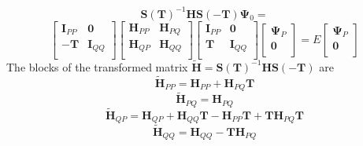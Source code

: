 \documentclass[12pt]{article}
\begin{document}
\begin{equation}
\mathbf{S}(\mathbf{T})^{-1} \mathbf{H} \mathbf{S}(-\mathbf{T})\boldsymbol{\Psi}_{0} = 
\end{equation}
\begin{equation}
\begin{bmatrix}
\mathbf{I}_{PP} & \mathbf{0} \\ 
-\mathbf{T} & \mathbf{I}_{QQ} \\ 
\end{bmatrix}
\begin{bmatrix}
 \mathbf{H}_{PP} & \mathbf{H}_{PQ} \\ 
 \mathbf{H}_{QP} & \mathbf{H}_{QQ} \\ 
\end{bmatrix} 
\begin{bmatrix}
\mathbf{I}_{PP} & \mathbf{0} \\ 
\mathbf{T} & \mathbf{I}_{QQ} \\ 
\end{bmatrix}
\begin{bmatrix}
 \boldsymbol{\Psi}_{P} \\ 
 \mathbf{0}\\ 
\end{bmatrix} 
= E 
\begin{bmatrix}
 \boldsymbol{\Psi}_{P} \\ 
 \mathbf{0}\\ 
\end{bmatrix} 
\label{eqn:TransEvalEqn}
\end{equation}
The blocks of the transformed matrix $\mathbf{\tilde{H}} = \mathbf{S}(\mathbf{T})^{-1} \mathbf{H} \mathbf{S}(-\mathbf{T})$ are
\begin{equation}
\mathbf{\tilde{H}}_{PP} = \mathbf{H}_{PP} + \mathbf{H}_{PQ}\mathbf{T}
\label{eqn:HPP}
\end{equation} 
\begin{equation}
\mathbf{\tilde{H}}_{PQ} = \mathbf{H}_{PQ}
\end{equation} 
\begin{equation}
\mathbf{\tilde{H}}_{QP} = \mathbf{H}_{QP} + \mathbf{H}_{QQ}\mathbf{T} - \mathbf{\mathbf{H}}_{PP}\mathbf{T} + \mathbf{T}\mathbf{H}_{PQ}\mathbf{T}
\label{eqn:HQP}
\end{equation} 
\begin{equation}
\mathbf{\tilde{H}}_{QQ} = \mathbf{H}_{QQ} -\mathbf{T}\mathbf{H}_{PQ}
\end{equation} 
\end{document}
